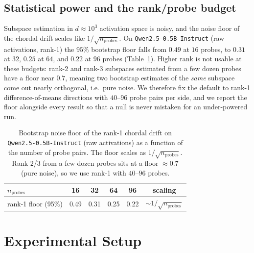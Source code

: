 \subsection{Statistical power and the rank/probe budget}
\label{sec:power}

Subspace estimation in $d \approx 10^3$ activation space is noisy, and the noise floor of
the chordal drift scales like $1/\sqrt{n_{\text{probes}}}$. On
\texttt{Qwen2.5-0.5B-Instruct} (raw activations, rank-1) the $95\%$ bootstrap floor falls
from $0.49$ at $16$ probes, to $0.31$ at $32$, $0.25$ at $64$, and $0.22$ at $96$ probes
(Table~\ref{tab:power}). Higher rank is not usable at these budgets: rank-2 and rank-3
subspaces estimated from a few dozen probes have a floor near $0.7$, meaning two bootstrap
estimates of the \emph{same} subspace come out nearly orthogonal, i.e.\ pure noise. We
therefore fix the default to rank-1 difference-of-means directions with $40$--$96$ probe
pairs per side, and we report the floor alongside every result so that a null is never
mistaken for an under-powered run.

\begin{table}[t]
\centering
\small
\begin{tabular}{@{}lccccc@{}}
\toprule
$n_{\text{probes}}$ & 16 & 32 & 64 & 96 & scaling \\
\midrule
rank-1 floor (95\%) & 0.49 & 0.31 & 0.25 & 0.22 & $\sim 1/\sqrt{n_{\text{probes}}}$ \\
\bottomrule
\end{tabular}
\caption{Bootstrap noise floor of the rank-1 chordal drift on
\texttt{Qwen2.5-0.5B-Instruct} (raw activations) as a function of the number of probe pairs.
The floor scales as $1/\sqrt{n_{\text{probes}}}$. Rank-2/3 from a few dozen probes sits at a
floor $\approx 0.7$ (pure noise), so we use rank-1 with $40$--$96$ probes.}
\label{tab:power}
\end{table}

\section{Experimental Setup}
\label{sec:setup}

